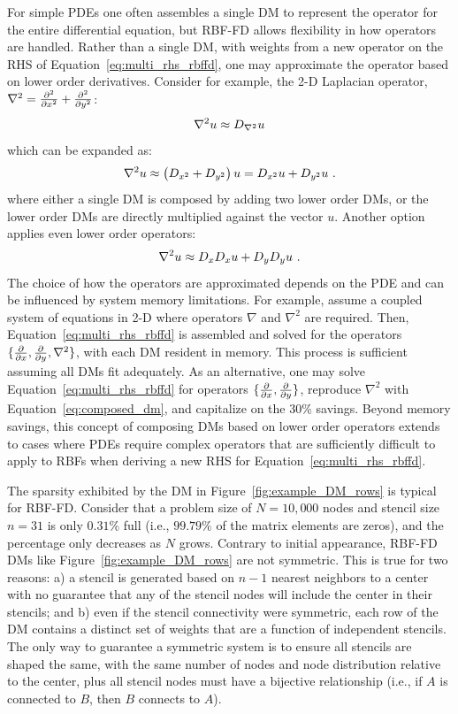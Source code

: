 \documentclass[11pt]{report}
\begin{document}
{For simple PDEs one often assembles a single DM to represent the operator for the entire differential equation, but RBF-FD allows flexibility in how operators are handled. Rather than a single DM, with weights from a new operator on the RHS of Equation~\ref{eq:multi_rhs_rbffd}, one may approximate the operator based on lower order derivatives. Consider for example, the 2-D Laplacian operator, $\nabla^2 = \frac{\partial^2 }{\partial x^2} + \frac{\partial^2 }{\partial y^2} $: 
\begin{align*}
\nabla^2 u \approx D_{\nabla^2 } u
\end{align*}
which can be expanded as: 
\begin{align*}
\nabla^2 u \approx \left(D_{x^2} + D_{y^2}\right) u = D_{x^2} u + D_{y^2} u \ .
\end{align*}
where either a single DM is composed by adding two lower order DMs, or the lower order DMs are directly multiplied against the vector $u$. Another option applies even lower order operators:
\begin{align}
\nabla^2 u \approx D_{x} D_{x} u + D_{y} D_{y} u \label{eq:composed_dm}\ .
\end{align}
The choice of how the operators are approximated depends on the PDE and can be influenced by system memory limitations. For example, assume a coupled system of equations in 2-D where operators $\nabla$ and $\nabla^2$ are required. Then, Equation~\ref{eq:multi_rhs_rbffd} is assembled and solved for the operators $\{\frac{\partial }{\partial x}, \frac{\partial }{\partial y}, \nabla^2\}$, with each DM resident in memory. This process is sufficient assuming all DMs fit adequately. As an alternative, one may solve Equation~\ref{eq:multi_rhs_rbffd} for operators $\{\frac{\partial }{\partial x}, \frac{\partial }{\partial y}\}$, reproduce $\nabla^2$ with Equation~\ref{eq:composed_dm}, and capitalize on the 30\% savings. 
Beyond memory savings, this concept of composing DMs based on lower order operators extends to cases where PDEs require complex operators that are sufficiently difficult to apply to RBFs when deriving a new RHS for Equation~\ref{eq:multi_rhs_rbffd}.  %

 

The sparsity exhibited by the DM in Figure~\ref{fig:example_DM_rows} is typical for RBF-FD. Consider that a problem size of $N=10,000$ nodes and stencil size $n=31$ is only $0.31\%$ full (i.e., $99.79\%$ of the matrix elements are zeros), and the percentage only decreases as $N$ grows. Contrary to initial appearance, RBF-FD DMs like Figure~\ref{fig:example_DM_rows} are not symmetric. This is true for two reasons: a) a stencil is generated based on $n-1$ nearest neighbors to a center with no guarantee that any of the stencil nodes will include the center in their stencils; and  b) even if the stencil connectivity were symmetric, each row of the DM contains a distinct set of weights that are a function of independent stencils. The only way to guarantee a symmetric system is to ensure all stencils are shaped the same, with the same number of nodes and node distribution relative to the center, plus all stencil nodes must have a bijective relationship (i.e., if $A$ is connected to $B$, then $B$ connects to $A$). 

}
\end{document}
